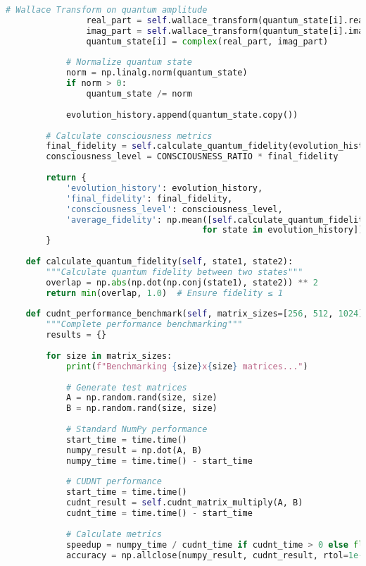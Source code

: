 \documentclass[11pt,a4paper]{article}
\begin{document}
\begin{lstlisting}[language=Python, caption=CUDNT Matrix Multiplication - Complete Implementation]
                # Wallace Transform on quantum amplitude
                real_part = self.wallace_transform(quantum_state[i].real)
                imag_part = self.wallace_transform(quantum_state[i].imag)
                quantum_state[i] = complex(real_part, imag_part)
            
            # Normalize quantum state
            norm = np.linalg.norm(quantum_state)
            if norm > 0:
                quantum_state /= norm
                
            evolution_history.append(quantum_state.copy())
            
        # Calculate consciousness metrics
        final_fidelity = self.calculate_quantum_fidelity(evolution_history[0], quantum_state)
        consciousness_level = CONSCIOUSNESS_RATIO * final_fidelity
        
        return {
            'evolution_history': evolution_history,
            'final_fidelity': final_fidelity,
            'consciousness_level': consciousness_level,
            'average_fidelity': np.mean([self.calculate_quantum_fidelity(evolution_history[0], state) 
                                       for state in evolution_history])
        }
    
    def calculate_quantum_fidelity(self, state1, state2):
        """Calculate quantum fidelity between two states"""
        overlap = np.abs(np.dot(np.conj(state1), state2)) ** 2
        return min(overlap, 1.0)  # Ensure fidelity ≤ 1
    
    def cudnt_performance_benchmark(self, matrix_sizes=[256, 512, 1024]):
        """Complete performance benchmarking"""
        results = {}
        
        for size in matrix_sizes:
            print(f"Benchmarking {size}x{size} matrices...")
            
            # Generate test matrices
            A = np.random.rand(size, size)
            B = np.random.rand(size, size)
            
            # Standard NumPy performance
            start_time = time.time()
            numpy_result = np.dot(A, B)
            numpy_time = time.time() - start_time
            
            # CUDNT performance
            start_time = time.time()
            cudnt_result = self.cudnt_matrix_multiply(A, B)
            cudnt_time = time.time() - start_time
            
            # Calculate metrics
            speedup = numpy_time / cudnt_time if cudnt_time > 0 else float('inf')
            accuracy = np.allclose(numpy_result, cudnt_result, rtol=1e-10)
            

\end{lstlisting}
\end{document}
